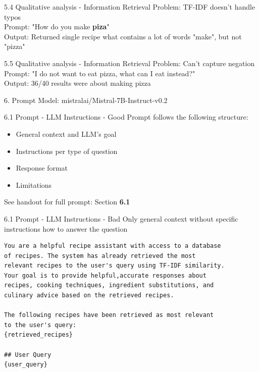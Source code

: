 \documentclass{beamer}
\begin{document}
\begin{frame} {5.4 Qualitative analysis - Information Retrieval}
  Problem: TF-IDF doesn't handle typos\\
  Prompt: "How do you make \textbf{piza}"\\
  Output: Returned single recipe what contains a lot of words "make", but not "pizza"
\end{frame}

\begin{frame} {5.5 Qualitative analysis - Information Retrieval}
  Problem: Can't capture negation\\
  Prompt:  "I do not want to eat pizza, what can I eat instead?"\\
  Output: 36/40 results were about making pizza
\end{frame}

\begin{frame}{6. Prompt}
  Model: mistralai/Mistral-7B-Instruct-v0.2
\end{frame}

\begin{frame}[fragile]{6.1 Prompt - LLM Instructions - Good}
  Prompt follows the following structure:
  \begin{itemize}
    \item General context and LLM's goal
    \item Instructions per type of question
    \item Response format
    \item Limitations
  \end{itemize}

  See handout for full prompt: Section \textbf{6.1}
\end{frame}

\begin{frame}[fragile]{6.1 Prompt - LLM Instructions - Bad}
  Only general context without specific instructions how to answer the question
  \begin{verbatim}
You are a helpful recipe assistant with access to a database
of recipes. The system has already retrieved the most
relevant recipes to the user's query using TF-IDF similarity.
Your goal is to provide helpful,accurate responses about
recipes, cooking techniques, ingredient substitutions, and
culinary advice based on the retrieved recipes.

The following recipes have been retrieved as most relevant
to the user's query:
{retrieved_recipes}

## User Query
{user_query}
\end{verbatim}
\end{frame}
\end{document}
